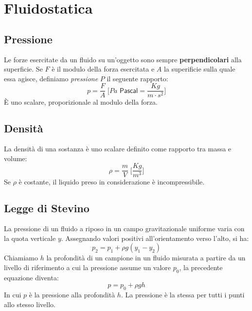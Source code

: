 \chapter{Fluidostatica}

    \section{Pressione} Le forze esercitate da un fluido su un'oggetto sono 
    sempre \textbf{perpendicolari} alla superficie. Se $F$ è il modulo della 
    forza esercitata e $A$ la superificie sulla quale essa agisce, definiamo
    \textit{pressione} $P$ il seguente rapporto:
        \begin{equation}
            p = \frac{F}{A} \; \Bigg[Pa \textsf{ Pascal} = \frac{Kg}{m \cdot 
            s^2} \Bigg]
        \end{equation}
    È uno scalare, proporizionale al modulo della forza.

    \section{Densità} La densità di una sostanza è uno scalare definito come 
    rapporto tra massa e volume:
        \begin{equation}
            \rho = \frac{m}{V} \; \Bigg[\frac{Kg}{m^3}\Bigg]
        \end{equation}
    Se $\rho$ è costante, il liquido preso in considerazione è incompressibile.

    \section{Legge di Stevino} La pressione di un fluido a riposo in un campo
    gravitazionale uniforme varia con la quota verticale $y$. Assegnando valori
    positivi all'orientamento verso l'alto, si ha:
        \begin{equation*}
            p_2 = p_1 + \rho g(y_1-y_2)
        \end{equation*}
    Chiamiamo $h$ la profondità di un campione in un fluido misurata a partire
    da un livello di riferimento a cui la pressione assume un valore $p_0$, la 
    precedente equazione diventa:
        \begin{equation}
            p = p_0 + \rho gh
        \end{equation}
    In cui $p$ è la pressione alla profondità $h$.
    La pressione è la stessa per tutti i punti allo stesso livello.

